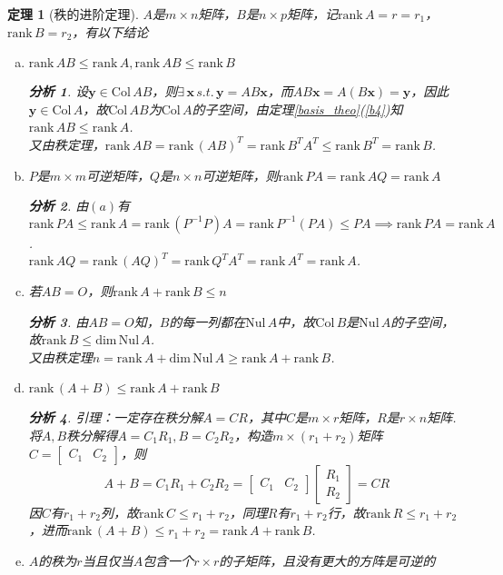 \documentclass[11pt,UTF8]{ctexart}
\newtheorem{theorem}{定理}
\newtheorem*{analysis}{分析}
\def\vx{\mathbf{x}}
\def\dim{\mathrm{dim}\,}
\def\rank{\mathrm{rank}\,}
\def\col{\mathrm{Col}\,}
\def\nul{\mathrm{Nul}\,}
\newcommand{\vb}[1]{\mathbf{#1}}
\begin{document}
\begin{theorem}[秩的进阶定理]%
$A$是$m\times n$矩阵，$B$是$n\times p$矩阵，记$\rank A=r=r_1$，$\rank B=r_2$，有以下结论
\begin{enumerate}[(a)]
	\itemsep -3pt
	\item $\rank AB\leq \rank A,\rank AB\leq \rank B$
	\begin{analysis}
	设$\vb{y}\in\col AB$，则$\exists\,\vx\,s.t.\,\vb{y}=AB\vx$，而$AB\vx=A(B\vx)=\vb{y}$，因此$\vb{y}\in\col A$，故$\col AB$为$\col A$的子空间，由定理\ref{basis_theo}(\ref{b4})知$\rank AB\leq \rank A$.\\
	又由秩定理，$\rank AB=\rank(AB)^T=\rank B^TA^T\leq\rank B^T=\rank B$.
	\end{analysis}
	\item $P$是$m\times m$可逆矩阵，$Q$是$n\times n$可逆矩阵，则$\rank PA=\rank AQ=\rank A$
	\begin{analysis}
	由$(a)$有$\rank PA\leq\rank A=\rank(P^{-1}P)A=\rank P^{-1}(PA)\leq PA\implies \rank PA=\rank A$.\\
	$\rank AQ=\rank (AQ)^T=\rank Q^TA^T=\rank A^T=\rank A$.
	\end{analysis}
	\item 若$AB=O$，则$\rank A+\rank B\leq n$
	\begin{analysis}
	由$AB=O$知，$B$的每一列都在$\nul A$中，故$\col B$是$\nul A$的子空间，故$\rank B\leq \dim\nul A$.\\
	又由秩定理$n=\rank A+\dim \nul A\geq\rank A+\rank B$.
	\end{analysis}
	\item $\rank(A+B)\leq\rank A+\rank B$
	\begin{analysis}
	引理：一定存在秩分解$A=CR$，其中$C$是$m\times r$矩阵，$R$是$r\times n$矩阵.\\
	将$A,B$秩分解得$A=C_1R_1,B=C_2R_2$，构造$m\times (r_1+r_2)$矩阵$C=\begin{bmatrix}C_1&C_2\end{bmatrix}$，则
	\[A+B=C_1R_1+C_2R_2=\begin{bmatrix}C_1&C_2\end{bmatrix}\begin{bmatrix}R_1\\R_2\end{bmatrix}=CR\]
	因$C$有$r_1+r_2$列，故$\rank C\leq r_1+r_2$，同理$R$有$r_1+r_2$行，故$\rank R\leq r_1+r_2$，进而$\rank (A+B)\leq r_1+r_2=\rank A+\rank B$.
	\end{analysis}
	\item $A$的秩为$r$当且仅当$A$包含一个$r\times r$的子矩阵，且没有更大的方阵是可逆的

\end{enumerate}
\end{theorem}
\end{document}
